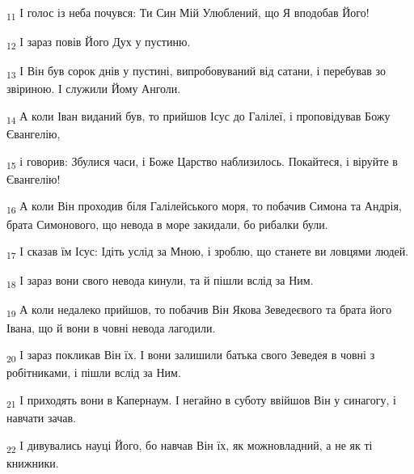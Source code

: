 \begin{tcolorbox}
\textsubscript{11} І голос із неба почувся: Ти Син Мій Улюблений, що Я вподобав Його!
\end{tcolorbox}
\begin{tcolorbox}
\textsubscript{12} І зараз повів Його Дух у пустиню.
\end{tcolorbox}
\begin{tcolorbox}
\textsubscript{13} І Він був сорок днів у пустині, випробовуваний від сатани, і перебував зо звіриною. І служили Йому Анголи.
\end{tcolorbox}
\begin{tcolorbox}
\textsubscript{14} А коли Іван виданий був, то прийшов Ісус до Галілеї, і проповідував Божу Євангелію,
\end{tcolorbox}
\begin{tcolorbox}
\textsubscript{15} і говорив: Збулися часи, і Боже Царство наблизилось. Покайтеся, і віруйте в Євангелію!
\end{tcolorbox}
\begin{tcolorbox}
\textsubscript{16} А коли Він проходив біля Галілейського моря, то побачив Симона та Андрія, брата Симонового, що невода в море закидали, бо рибалки були.
\end{tcolorbox}
\begin{tcolorbox}
\textsubscript{17} І сказав їм Ісус: Ідіть услід за Мною, і зроблю, що станете ви ловцями людей.
\end{tcolorbox}
\begin{tcolorbox}
\textsubscript{18} І зараз вони свого невода кинули, та й пішли вслід за Ним.
\end{tcolorbox}
\begin{tcolorbox}
\textsubscript{19} А коли недалеко прийшов, то побачив Він Якова Зеведеєвого та брата його Івана, що й вони в човні невода лагодили.
\end{tcolorbox}
\begin{tcolorbox}
\textsubscript{20} І зараз покликав Він їх. І вони залишили батька свого Зеведея в човні з робітниками, і пішли вслід за Ним.
\end{tcolorbox}
\begin{tcolorbox}
\textsubscript{21} І приходять вони в Капернаум. І негайно в суботу ввійшов Він у синагогу, і навчати зачав.
\end{tcolorbox}
\begin{tcolorbox}
\textsubscript{22} І дивувались науці Його, бо навчав Він їх, як можновладний, а не як ті книжники.
\end{tcolorbox}
